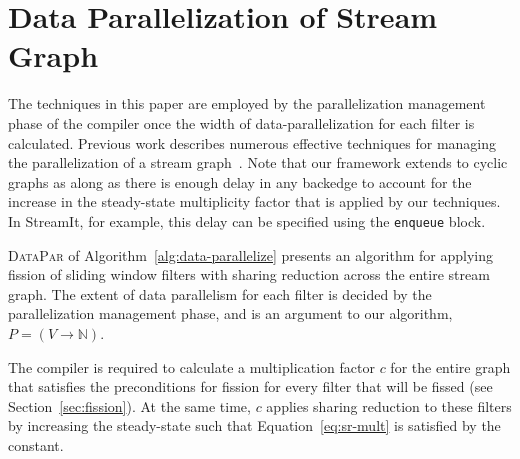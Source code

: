 \section{Data Parallelization of Stream Graph}
\label{sec:data-par}

The techniques in this paper are employed by the parallelization
management phase of the compiler once the width of
data-parallelization for each filter is calculated.  Previous work
describes numerous effective techniques for managing the
parallelization of a stream
graph~\cite{kudlur08,gordon-asplos06,flextream,udupa09-gpu,liao06brook}.
Note that our framework extends to cyclic graphs as along as there is
enough delay in any backedge to account for the increase in the
steady-state multiplicity factor that is applied by our techniques.
In StreamIt, for example, this delay can be specified using the
{\tt enqueue} block.

\textsc{DataPar} of Algorithm~\ref{alg:data-parallelize} presents an
algorithm for applying fission of sliding window filters with sharing
reduction across the entire stream graph.  The extent of data
parallelism for each filter is decided by the parallelization
management phase, and is an argument to our algorithm, $P=(V
\rightarrow \mathbb{N})$. 

The compiler is required to calculate a multiplication factor $c$ for
the entire graph that satisfies the preconditions for fission for
every filter that will be fissed (see Section~\ref{sec:fission}).  At
the same time, $c$ applies sharing reduction to these filters by
increasing the steady-state such that Equation~\ref{eq:sr-mult} is
satisfied by the constant.

